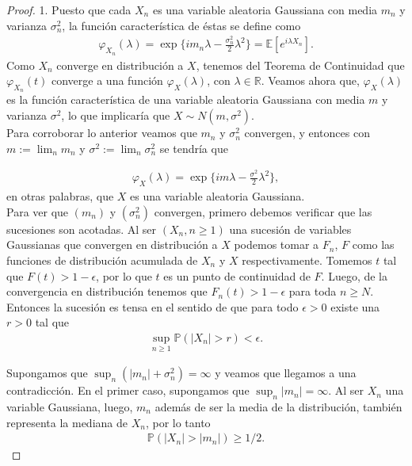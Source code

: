 \begin{proof}
1. Puesto que cada $X_n$ es una variable aleatoria Gaussiana con media $m_n$ y varianza $\sigma_n^2$, la función característica de éstas se define como
	\begin{align*}
	\varphi_{X_n} (\lambda) = \exp \{i m_n \lambda - \frac{\sigma_n^2}{2} \lambda^2\} = \mathbb{E}\left[ e^{i \lambda X_n} \right].
	\end{align*}
Como $X_n$ converge en distribución a $X$, tenemos del Teorema de Continuidad \cite[p.~320]{shiryaev} que $\varphi_{X_n} (t)$ converge a una función $\varphi_X (\lambda)$, con $\lambda \in \mathbb{R}$. Veamos ahora que, $\varphi_X(\lambda)$ es la función característica de una variable aleatoria Gaussiana con media $m$ y varianza $\sigma^2$, lo que implicaría que $X \sim N(m, \sigma^2)$. \\

Para corroborar lo anterior veamos que $m_n$ y $\sigma_n^2$ convergen, y entonces con $m := \lim_n m_n$ y $\sigma^2 := \lim_n \sigma_n^2$ se tendría que

\begin{align*}
	\varphi_X(\lambda) = \exp \{i m \lambda - \frac{\sigma^2}{2} \lambda^2\},
\end{align*}
en otras palabras, que $X$ es una variable aleatoria Gaussiana. \\

Para ver que $(m_n)$ y $(\sigma_n^2)$ convergen, primero debemos verificar que las sucesiones son acotadas. Al ser $(X_n, n \geq 1)$ una sucesión de variables Gaussianas que convergen en distribución a $X$ podemos tomar a $F_n$, $F$ como las funciones de distribución acumulada de $X_n$ y $X$ respectivamente. Tomemos $t$ tal que $F(t) > 1 - \epsilon$, por lo que $t$ es un punto de continuidad de $F$. Luego, de la convergencia en distribución tenemos que $F_n(t) > 1 - \epsilon$ para toda $n \geq N$. Entonces la sucesión es tensa en el sentido de que para todo $\epsilon > 0$ existe una $r > 0$ tal que
\begin{align}
	\sup_{n \geq 1} \mathbb{P} (|X_n| > r) < \epsilon. \label{tightness}
\end{align}

Supongamos que $\sup_n (|m_n| + \sigma_n^2) = \infty$ y veamos que llegamos a una contradicción. En el primer caso, supongamos que $\sup_n |m_n| = \infty$. Al ser $X_n$ una variable Gaussiana, luego, $m_n$ además de ser la media de la distribución, también representa la mediana de $X_n$, por lo tanto 
\begin{align*}
	\mathbb{P}(|X_n| > |m_n|) \geq 1/2.
\end{align*}


\end{proof}
